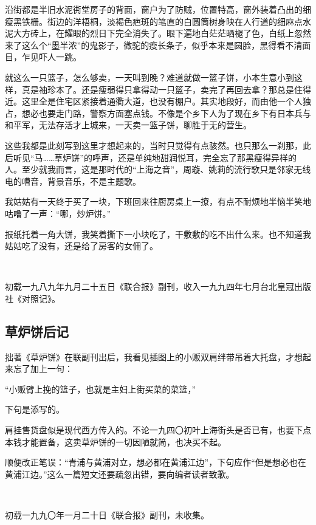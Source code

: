 \par 沿街都是半旧水泥衖堂房子的背面，窗户为了防贼，位置特高，窗外装着凸出的细瘦黑铁栅。街边的洋梧桐，淡褐色疤斑的笔直的白圆筒树身映在人行道的细麻点水泥大方砖上，在耀眼的烈日下完全消失了。眼下遍地白茫茫晒褪了色，白纸上忽然来了这么个“墨半浓”的鬼影子，微驼的瘦长条子，似乎本来是圆脸，黑得看不清面目，乍见吓人一跳。
\par 就这么一只篮子，怎么够卖，一天叫到晚？难道就做一篮子饼，小本生意小到这样，真是袖珍本了。还是瘦弱得只拿得动一只篮子，卖完了再回去拿？那总是住得近。这里全是住宅区紧接着通衢大道，也没有棚户。其实地段好，而由他一个人独占，想必也要走门路，警察方面塞点钱。不像是个乡下人为了现在乡下有日本兵与和平军，无法存活才上城来，一天卖一篮子饼，聊胜于无的营生。
\par 这些我都是此刻写到这里才想起来的，当时只觉得有点骇然。也只那么一刹那，此后听见“马……草炉饼”的呼声，还是单纯地甜润悦耳，完全忘了那黑瘦得异样的人。至少就我而言，这是那时代的“上海之音”，周璇、姚莉的流行歌只是邻家无线电的嘈音，背景音乐，不是主题歌。
\par 我姑姑有一天终于买了一块，下班回来往厨房桌上一撩，有点不耐烦地半恼半笑地咕噜了一声：“哪，炒炉饼。”
\par 报纸托着一角大饼，我笑着撕下一小块吃了，干敷敷的吃不出什么来。也不知道我姑姑吃了没有，还是给了房客的女佣了。
\par  
\par *初载一九八九年九月二十五日《联合报》副刊，收入一九九四年七月台北皇冠出版社《对照记》。



\subsection{草炉饼后记}


\par 拙著《草炉饼》在联副刊出后，我看见插图上的小贩双肩绊带吊着大托盘，才想起来忘了加上一句：
\par “小贩臂上挽的篮子，也就是主妇上街买菜的菜篮，”
\par 下句是添写的。
\par 肩挂售货盘似是现代西方传入的。不论一九四〇初叶上海街头是否已有，也要下点本钱才能置备，这卖草炉饼的一切因陋就简，也决买不起。
\par 顺便改正笔误：“青浦与黄浦对立，想必都在黄浦江边”，下句应作“但是想必也在黄浦江边。”这么一篇短文还要疏忽出错，要向编者读者致歉。
\par  
\par *初载一九九〇年一月二十日《联合报》副刊，未收集。



